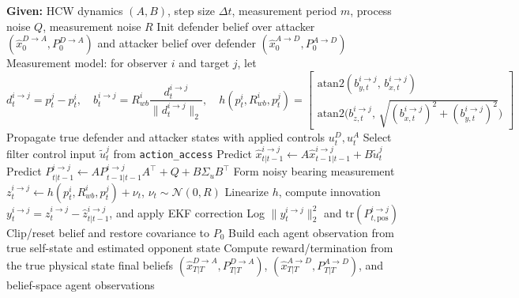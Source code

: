 \begin{algorithm}[H]
\caption{Agent-Centric Bearing-Only Kalman Filter Update}
\label{alg:kf-methodology}
\begin{algorithmic}[1]
\State \textbf{Given:} HCW dynamics $(A,B)$, step size $\Delta t$, measurement period $m$, process noise $Q$, measurement noise $R$
\State Init defender belief over attacker $(\hat{x}^{D\to A}_0,P^{D\to A}_0)$ and attacker belief over defender $(\hat{x}^{A\to D}_0,P^{A\to D}_0)$
\State Measurement model: for observer $i$ and target $j$, let
\[
d_t^{i\to j}=p_t^j-p_t^i,\quad
b_t^{i\to j}=R_{wb}^i\frac{d_t^{i\to j}}{\|d_t^{i\to j}\|_2},\quad
h(p_t^i,R_{wb}^i,p_t^j)=
\begin{bmatrix}
\mathrm{atan2}(b_{y,t}^{i\to j},\,b_{x,t}^{i\to j})\\[2pt]
\mathrm{atan2}\!\big(b_{z,t}^{i\to j},\,\sqrt{(b_{x,t}^{i\to j})^2+(b_{y,t}^{i\to j})^2}\big)
\end{bmatrix}
\]
  \State Propagate true defender and attacker states with applied controls $u_t^{D},u_t^{A}$
    \State Select filter control input $\tilde{u}_t^j$ from \texttt{action\_access}
    \State Predict $\hat{x}_{t|t-1}^{i\to j}\leftarrow A\hat{x}_{t-1|t-1}^{i\to j}+B\tilde{u}_t^j$
    \State Predict $P_{t|t-1}^{i\to j}\leftarrow A P_{t-1|t-1}^{i\to j} A^\top + Q + B\Sigma_u B^\top$
      \State Form noisy bearing measurement $z_t^{i\to j}\leftarrow h(p_t^i,R_{wb}^i,p_t^j)+\nu_t$, $\nu_t\sim\mathcal{N}(0,R)$
      \State Linearize $h$, compute innovation $y_t^{i\to j}=z_t^{i\to j}-\hat{z}_{t|t-1}^{i\to j}$, and apply EKF correction
      \State Log $\|y_t^{i\to j}\|_2^2$ and $\mathrm{tr}(P^{i\to j}_{t,\mathrm{pos}})$
    \EndIf
      \State Clip/reset belief and restore covariance to $P_0$
    \EndIf
  \EndFor
  \State Build each agent observation from true self-state and estimated opponent state
  \State Compute reward/termination from the true physical state
\EndFor
\State \Return final beliefs $(\hat{x}^{D\to A}_{T|T},P^{D\to A}_{T|T})$, $(\hat{x}^{A\to D}_{T|T},P^{A\to D}_{T|T})$, and belief-space agent observations
\end{algorithmic}
\end{algorithm}
